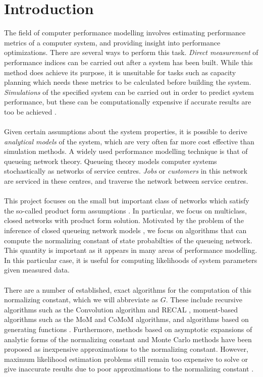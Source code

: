 \chapter{Introduction}

The field of computer performance modelling involves estimating performance metrics of a computer system, and providing insight into performance optimizations. There are several ways to perform this task. \textit{Direct measurement} of performance indices can be carried out after a system has been built. While this method does achieve its purpose, it is unsuitable for tasks such as capacity planning which needs these metrics to be calculated before building the system. \textit{Simulations} of the specified system can be carried out in order to predict system performance, but these can be computationally expensive if accurate results are too be achieved \cite{BalsamoProductNetworks}. 
\\\\
Given certain assumptions about the system properties, it is possible to derive \textit{analytical models} of the system, which are very often far more cost effective than simulation methods. A widely used performance modelling technique is that of queueing network theory. Queueing theory models computer systems stochastically as networks of service centres. \textit{Jobs} or \textit{customers} in this network are serviced in these centres, and traverse the network between service centres.
\\\\
This project focuses on the small but important class of networks which satisfy the so-called product form assumptions \cite{Bolch2006QueueingApplications}. In particular, we focus on multiclass, closed networks with product form solution. Motivated by the problem of the inference of closed queueing network models \cite{Casale2017AcceleratingMethods}, we focus on algorithms that can compute the normalizing constant of state probabilties of the queueing network. This quantity is important as it appears in many areas of performance modelling. In this particular case, it is useful for computing likelihoods of system parameters given measured data.
\\\\
There are a number of established, exact algorithms for the computation of this normalizing constant, which we will abbreviate as \(G\). These include recursive algorithms such as the Convolution algorithm \cite{Buzen1973ComputationalServers} and RECAL \cite{Conway1986RECAL---aNetworks}, moment-based algorithms \cite{Casale2011ExactMoments} such as the MoM and CoMoM algorithms, and algorithms based on generating functions \cite{MultidimensionalJSTOR}. Furthermore, methods based on asymptotic expansions of analytic forms of the normalizing constant \cite{McKenna1984AsymptoticNetworks} and Monte Carlo methods \cite{Ross1994MonteNetworks} have been proposed as inexpensive approximations to the normalizing constant. However, maximum likelihood estimation problems still remain too expensive to solve or give inaccurate results due to poor approximations to the normalizing constant \cite{Casale2017AcceleratingMethods}.
